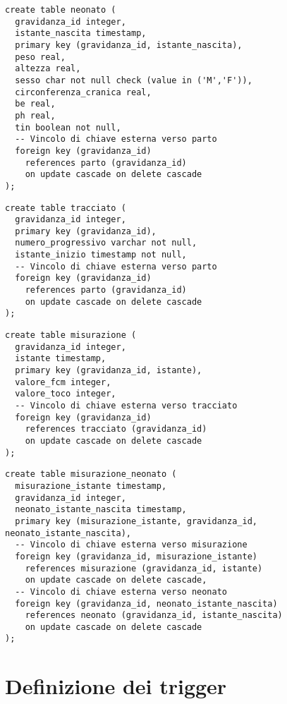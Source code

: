 \begin{lstlisting}[float,caption={Definizione della tabella \tab{neonato}.},label=ptabneonato]
create table neonato (
  gravidanza_id integer,
  istante_nascita timestamp,
  primary key (gravidanza_id, istante_nascita),
  peso real,
  altezza real,
  sesso char not null check (value in ('M','F')),
  circonferenza_cranica real,
  be real,
  ph real,
  tin boolean not null,
  -- Vincolo di chiave esterna verso parto
  foreign key (gravidanza_id)
    references parto (gravidanza_id)
    on update cascade on delete cascade
);
\end{lstlisting}

\begin{lstlisting}[float,caption={Definizione della tabella \tab{tracciato}.},label=ptabtracciato]
create table tracciato (
  gravidanza_id integer,
  primary key (gravidanza_id),
  numero_progressivo varchar not null,
  istante_inizio timestamp not null,
  -- Vincolo di chiave esterna verso parto
  foreign key (gravidanza_id)
    references parto (gravidanza_id)
    on update cascade on delete cascade
);
\end{lstlisting}

\begin{lstlisting}[float,caption={Definizione della tabella \tab{misurazione}.},label=ptabmisurazione]
create table misurazione (
  gravidanza_id integer,
  istante timestamp,
  primary key (gravidanza_id, istante),
  valore_fcm integer,
  valore_toco integer,
  -- Vincolo di chiave esterna verso tracciato
  foreign key (gravidanza_id)
    references tracciato (gravidanza_id)
    on update cascade on delete cascade
);
\end{lstlisting}

\begin{lstlisting}[float,caption={Definizione della tabella \tab{misurazione\_neonato}.},label=ptabmisurazioneneonato]
create table misurazione_neonato (
  misurazione_istante timestamp,
  gravidanza_id integer,
  neonato_istante_nascita timestamp,
  primary key (misurazione_istante, gravidanza_id, neonato_istante_nascita),
  -- Vincolo di chiave esterna verso misurazione
  foreign key (gravidanza_id, misurazione_istante)
    references misurazione (gravidanza_id, istante)
    on update cascade on delete cascade,
  -- Vincolo di chiave esterna verso neonato
  foreign key (gravidanza_id, neonato_istante_nascita)
    references neonato (gravidanza_id, istante_nascita)
    on update cascade on delete cascade
);
\end{lstlisting}

\FloatBarrier

\section{Definizione dei trigger}
